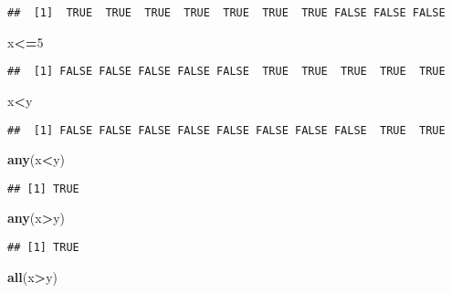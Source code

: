 \documentclass[
]{article}
\newenvironment{Shaded}{\begin{snugshade}}{\end{snugshade}}
\newcommand{\DecValTok}[1]{\textcolor[rgb]{0.00,0.00,0.81}{#1}}
\newcommand{\FunctionTok}[1]{\textcolor[rgb]{0.13,0.29,0.53}{\textbf{#1}}}
\newcommand{\NormalTok}[1]{#1}
\newcommand{\SpecialCharTok}[1]{\textcolor[rgb]{0.81,0.36,0.00}{\textbf{#1}}}
\begin{document}
\begin{verbatim}
##  [1]  TRUE  TRUE  TRUE  TRUE  TRUE  TRUE  TRUE FALSE FALSE FALSE
\end{verbatim}

\begin{Shaded}
\begin{Highlighting}[]
\NormalTok{x}\SpecialCharTok{\textless{}=}\DecValTok{5}
\end{Highlighting}
\end{Shaded}

\begin{verbatim}
##  [1] FALSE FALSE FALSE FALSE FALSE  TRUE  TRUE  TRUE  TRUE  TRUE
\end{verbatim}

\begin{Shaded}
\begin{Highlighting}[]
\NormalTok{x}\SpecialCharTok{\textless{}}\NormalTok{y}
\end{Highlighting}
\end{Shaded}

\begin{verbatim}
##  [1] FALSE FALSE FALSE FALSE FALSE FALSE FALSE FALSE  TRUE  TRUE
\end{verbatim}

\begin{Shaded}
\begin{Highlighting}[]
\FunctionTok{any}\NormalTok{(x}\SpecialCharTok{\textless{}}\NormalTok{y)}
\end{Highlighting}
\end{Shaded}

\begin{verbatim}
## [1] TRUE
\end{verbatim}

\begin{Shaded}
\begin{Highlighting}[]
\FunctionTok{any}\NormalTok{(x}\SpecialCharTok{\textgreater{}}\NormalTok{y)}
\end{Highlighting}
\end{Shaded}

\begin{verbatim}
## [1] TRUE
\end{verbatim}

\begin{Shaded}
\begin{Highlighting}[]
\FunctionTok{all}\NormalTok{(x}\SpecialCharTok{\textgreater{}}\NormalTok{y)}
\end{Highlighting}
\end{Shaded}
\end{document}
